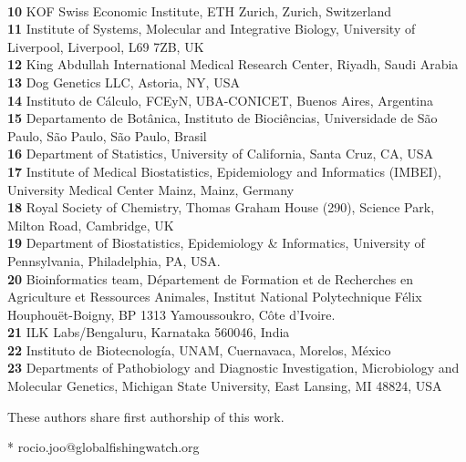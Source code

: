 \documentclass[10pt,letterpaper]{article}
\begin{document}
\begin{flushleft}
\\
\textbf{10} KOF Swiss Economic Institute, ETH Zurich, Zurich, Switzerland
\\
\textbf{11} Institute of Systems, Molecular and Integrative Biology, University of Liverpool, Liverpool, L69 7ZB, UK
\\
\textbf{12} King Abdullah International Medical Research Center, Riyadh, Saudi Arabia
\\
\textbf{13} Dog Genetics LLC, Astoria, NY, USA
\\
\textbf{14} Instituto de Cálculo, FCEyN, UBA-CONICET, Buenos Aires, Argentina
\\
\textbf{15} Departamento de Botânica, Instituto de Biociências, Universidade de São Paulo, São Paulo, São Paulo, Brasil
\\
\textbf{16} Department of Statistics, University of California, Santa Cruz, CA, USA
\\
\textbf{17} Institute of Medical Biostatistics, Epidemiology and Informatics (IMBEI), University Medical Center Mainz, Mainz, Germany
\\
\textbf{18} Royal Society of Chemistry, Thomas Graham House (290), Science Park, Milton Road, Cambridge, UK
\\
\textbf{19} Department of Biostatistics, Epidemiology \& Informatics, University of Pennsylvania, Philadelphia, PA, USA.
\\
\textbf{20} Bioinformatics team, Département de Formation et de Recherches en Agriculture et Ressources Animales, Institut National Polytechnique Félix Houphouët-Boigny, BP 1313 Yamoussoukro, Côte d’Ivoire.
\\
\textbf{21} ILK Labs/Bengaluru, Karnataka 560046, India
\\
\textbf{22} Instituto de Biotecnología, UNAM, Cuernavaca, Morelos, México
\\
\textbf{23} Departments of Pathobiology and Diagnostic Investigation, Microbiology and Molecular Genetics, Michigan State University, East Lansing, MI 48824, USA
\\
\bigskip

% 
%
\Yinyang These authors share first authorship of this work.




* rocio.joo@globalfishingwatch.org

\end{flushleft}
\end{document}
